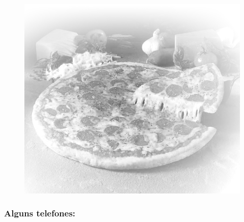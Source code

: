 \begin{figure}[h!]
    \centering
    \includegraphics[width=.45\textwidth]{img/barao/pizza.jpg}
\end{figure}

\subsubsection{Alguns telefones:}

